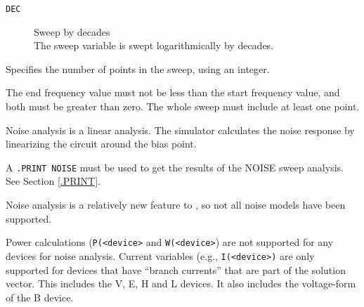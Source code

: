 \begin{Command}
\begin{Arguments}
\begin{description}
\item[\tt DEC] Sweep by decades\\
The sweep variable is swept logarithmically by decades.

\end{description}

Specifies the number of points in the sweep, using an integer.


The end frequency value must not be less than the start frequency value,
and both must be greater than zero. The whole sweep must include at
least one point.

\end{Arguments}

\comments

Noise analysis is a linear analysis. The simulator calculates the noise
response by linearizing the circuit around the bias point.

A \texttt{.PRINT NOISE} must be used to get the results of the NOISE sweep
analysis.  See Section \ref{.PRINT}.

Noise analysis is a relatively new feature to \Xyce{}, so not all noise models
have been supported.

Power calculations (\texttt{P(<device>} and \texttt{W(<device>}) are not supported for any
devices for noise analysis.  Current variables (e.g., \texttt{I(<device>)} are only supported
for devices that have ``branch currents'' that are part of the solution vector. This includes
the V, E, H and L devices.  It also includes the voltage-form of the B device.

\end{Command}
